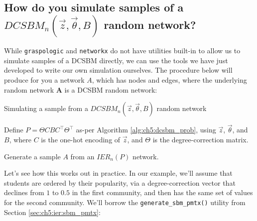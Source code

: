 \subsection{How do you simulate samples of a $DCSBM_n(\vec z, \vec \theta, B)$ random network?}

While \texttt{graspologic} and \texttt{networkx} do not have utilities built-in to allow us to simulate samples of a DCSBM directly, we can use the tools we have just developed to write our own simulation ourselves. The procedure below will produce for you a network $A$, which has nodes and edges, where the underlying random network $\mathbf A$ is a DCSBM random network:

\begin{algorithm}[h]\caption{Simulating a sample from a $DCSBM_n(\vec z, \vec \theta, B)$ random network}
\label{alg:ch5:sbm}
\SetAlgoLined
{}

Define $P = \Theta CBC^\top \Theta^\top$ as-per Algorithm \ref{alg:ch5:dcsbm_prob}, using $\vec z$, $\vec \theta$, and $B$, where $C$ is the one-hot encoding of $\vec z$, and $\Theta$ is the degree-correction matrix.

Generate a sample $A$ from an $IER_n(P)$ network.

\end{algorithm}

Let's see how this works out in practice. In our example, we'll assume that students are ordered by their popularity, via a degree-correction vector that declines from $1$ to $0.5$ in the first community, and then has the same set of values for the second community. We'll borrow the \texttt{generate\_sbm\_pmtx()} utility from Section \ref{sec:ch5:ier:sbm_pmtx}:


